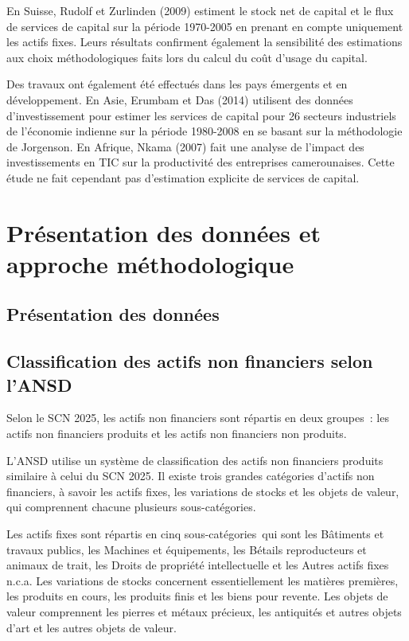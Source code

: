 \documentclass[12pt,a4paper,oneside]{report}
\begin{document}
En Suisse, Rudolf et Zurlinden (2009) estiment le stock net de capital et le flux de services de capital sur
la période 1970-2005 en prenant en compte uniquement les actifs fixes. Leurs résultats confirment également la
sensibilité des estimations aux choix méthodologiques faits lors du calcul du coût d’usage du capital.

Des travaux ont également été effectués dans les pays émergents et en développement. En Asie, Erumbam et Das
(2014) utilisent des données d’investissement pour estimer les services de capital pour 26 secteurs
industriels de l’économie indienne sur la période 1980-2008 en se basant sur la méthodologie de Jorgenson. En
Afrique, Nkama (2007) fait une analyse de l’impact des investissements en TIC sur la productivité des
entreprises camerounaises. Cette étude ne fait cependant pas d’estimation explicite de services de capital.

\chapter{Présentation des données et approche méthodologique}

\section{Présentation des données}

\section{Classification des actifs non financiers selon l’ANSD}

Selon le SCN 2025, les actifs non financiers sont répartis en deux groupes~: les actifs non financiers
produits et les actifs non financiers non produits.

L’ANSD utilise un système de classification des actifs non financiers produits similaire à celui du SCN 2025.
Il existe trois grandes catégories d’actifs non financiers, à savoir les actifs fixes, les variations de
stocks et les objets de valeur, qui comprennent chacune plusieurs sous-catégories.

Les actifs fixes sont répartis en cinq sous-catégories~qui sont les Bâtiments et travaux publics, les Machines
et équipements, les Bétails reproducteurs et animaux de trait, les Droits de propriété intellectuelle et les
Autres actifs fixes n.c.a. Les variations de stocks concernent essentiellement les matières premières, les
produits en cours, les produits finis et les biens pour revente. Les objets de valeur comprennent les pierres
et métaux précieux, les antiquités et autres objets d’art et les autres objets de valeur.
\end{document}
